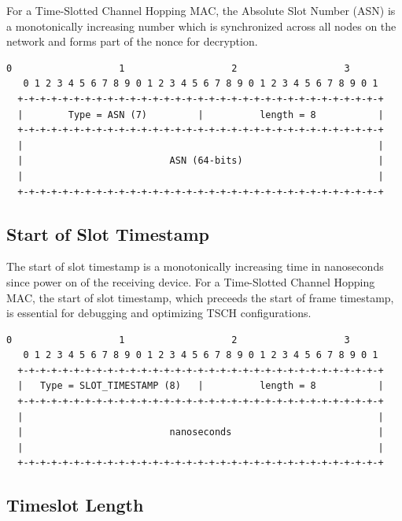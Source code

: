\documentclass[12pt]{article}
\renewcommand\_{\textunderscore\allowbreak}
\begin{document}
For a Time-Slotted Channel Hopping MAC, the Absolute Slot Number (ASN)
is a monotonically increasing number which is synchronized across all nodes on
the network and forms part of the nonce for decryption.

\begin{Verbatim}[samepage=true]
   0                   1                   2                   3
   0 1 2 3 4 5 6 7 8 9 0 1 2 3 4 5 6 7 8 9 0 1 2 3 4 5 6 7 8 9 0 1
  +-+-+-+-+-+-+-+-+-+-+-+-+-+-+-+-+-+-+-+-+-+-+-+-+-+-+-+-+-+-+-+-+
  |        Type = ASN (7)         |          length = 8           |
  +-+-+-+-+-+-+-+-+-+-+-+-+-+-+-+-+-+-+-+-+-+-+-+-+-+-+-+-+-+-+-+-+
  |                                                               |
  |                          ASN (64-bits)                        |
  |                                                               |
  +-+-+-+-+-+-+-+-+-+-+-+-+-+-+-+-+-+-+-+-+-+-+-+-+-+-+-+-+-+-+-+-+
\end{Verbatim}

\subsection{Start of Slot Timestamp}

The start of slot timestamp is a monotonically increasing time in nanoseconds
since power on of the receiving device.  For a Time-Slotted Channel Hopping
MAC, the start of slot timestamp, which preceeds the start of frame timestamp,
is essential for debugging and optimizing TSCH configurations.

\begin{Verbatim}[samepage=true]
   0                   1                   2                   3
   0 1 2 3 4 5 6 7 8 9 0 1 2 3 4 5 6 7 8 9 0 1 2 3 4 5 6 7 8 9 0 1
  +-+-+-+-+-+-+-+-+-+-+-+-+-+-+-+-+-+-+-+-+-+-+-+-+-+-+-+-+-+-+-+-+
  |   Type = SLOT_TIMESTAMP (8)   |          length = 8           |
  +-+-+-+-+-+-+-+-+-+-+-+-+-+-+-+-+-+-+-+-+-+-+-+-+-+-+-+-+-+-+-+-+
  |                                                               |
  |                          nanoseconds                          |
  |                                                               |
  +-+-+-+-+-+-+-+-+-+-+-+-+-+-+-+-+-+-+-+-+-+-+-+-+-+-+-+-+-+-+-+-+
\end{Verbatim}

\subsection{Timeslot Length}
\end{document}
